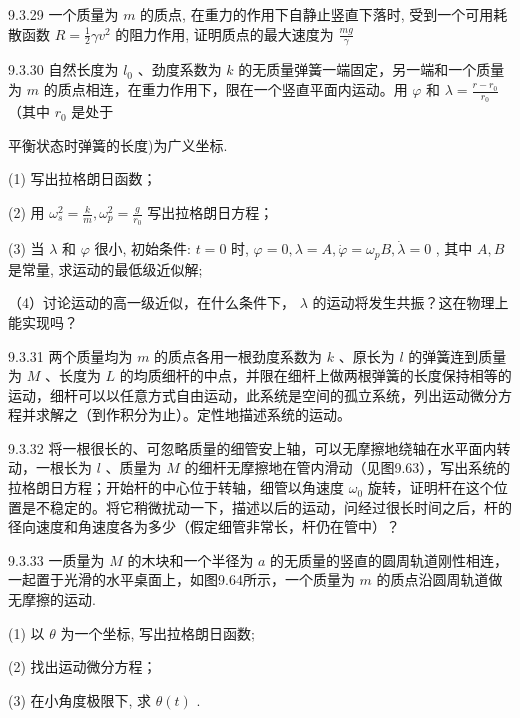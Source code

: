 \begin{problem}{9.3.29}
一个质量为 $m$ 的质点, 在重力的作用下自静止竖直下落时, 受到一个可用耗散函数 $R = \frac{1}{2} \gamma v^2$ 的阻力作用, 证明质点的最大速度为 $\frac{mg}{\gamma}$
\end{problem}
\clearpage


\begin{problem}{9.3.30}
自然长度为 $l_{0}$ 、劲度系数为 $k$ 的无质量弹簧一端固定，另一端和一个质量为 $m$ 的质点相连，在重力作用下，限在一个竖直平面内运动。用 $\varphi$ 和 $\lambda = \frac{r - r_0}{r_0}$ （其中 $r_0$ 是处于

平衡状态时弹簧的长度)为广义坐标.

(1) 写出拉格朗日函数；

(2) 用 $\omega_{s}^{2} = \frac{k}{m}, \omega_{p}^{2} = \frac{g}{r_{0}}$ 写出拉格朗日方程；

(3) 当 $\lambda$ 和 $\varphi$ 很小, 初始条件: $t = 0$ 时, $\varphi = 0, \lambda = A, \dot{\varphi} = \omega_p B, \dot{\lambda} = 0$ , 其中 $A, B$ 是常量, 求运动的最低级近似解;

（4）讨论运动的高一级近似，在什么条件下， $\lambda$ 的运动将发生共振？这在物理上能实现吗？
\begin{center}

\end{center}
\end{problem}
\clearpage


\begin{problem}{9.3.31}
两个质量均为 $m$ 的质点各用一根劲度系数为 $k$ 、原长为 $l$ 的弹簧连到质量为 $M$ 、长度为 $L$ 的均质细杆的中点，并限在细杆上做两根弹簧的长度保持相等的运动，细杆可以以任意方式自由运动，此系统是空间的孤立系统，列出运动微分方程并求解之（到作积分为止）。定性地描述系统的运动。
\end{problem}
\clearpage


\begin{problem}{9.3.32}
将一根很长的、可忽略质量的细管安上轴，可以无摩擦地绕轴在水平面内转动，一根长为 $l$ 、质量为 $M$ 的细杆无摩擦地在管内滑动（见图9.63），写出系统的拉格朗日方程；开始杆的中心位于转轴，细管以角速度 $\omega_0$ 旋转，证明杆在这个位置是不稳定的。将它稍微扰动一下，描述以后的运动，问经过很长时间之后，杆的径向速度和角速度各为多少（假定细管非常长，杆仍在管中）？
\begin{center}

\end{center}
\end{problem}
\clearpage


\begin{problem}{9.3.33}
一质量为 $M$ 的木块和一个半径为 $a$ 的无质量的竖直的圆周轨道刚性相连，一起置于光滑的水平桌面上，如图9.64所示，一个质量为 $m$ 的质点沿圆周轨道做无摩擦的运动.

(1) 以 $\theta$ 为一个坐标, 写出拉格朗日函数;

(2) 找出运动微分方程；

(3) 在小角度极限下, 求 $\theta(t)$ .
\begin{center}

\end{center}
\end{problem}
\clearpage


